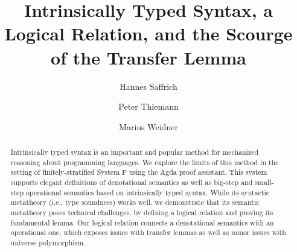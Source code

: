 \documentclass[acmsmall,anonymous,review,screen]{acmart}
\begin{document}
\title{Intrinsically Typed Syntax, a Logical Relation, and the Scourge of the Transfer Lemma}

\author{Hannes Saffrich}


\author{Peter Thiemann}

\author{Marius Weidner}


\begin{abstract}
Intrinsically typed syntax is an important and popular method for
mechanized reasoning about programming languages.
We explore the limits of this method in the setting of
finitely-stratified System F using the Agda proof assistant. This
system supports elegant definitions of 
denotational semantics as well as big-step 
and small-step operational semantics based on intrinsically typed syntax. While its syntactic
metatheory (i.e., type soundness) works well,
we demonstrate that its semantic metatheory poses technical
challenges, by defining a logical relation and proving its fundamental
lemma.
Our logical relation connects a denotational semantics with an
operational one, which exposes issues with transfer lemmas as well as
minor issues with universe polymorphism.
\end{abstract}
\end{document}
